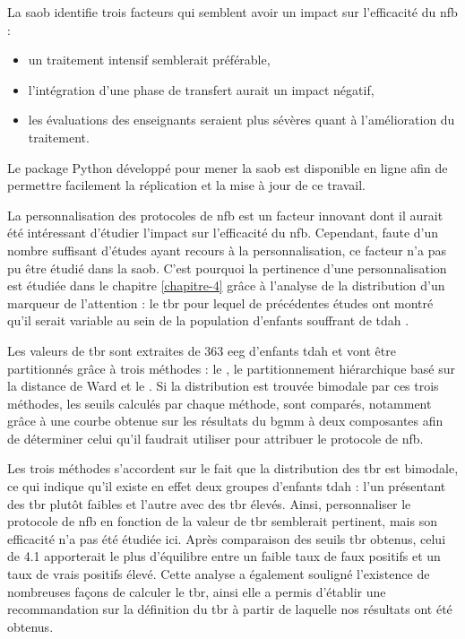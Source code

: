 La \gls{saob} identifie trois facteurs qui semblent avoir un impact sur l'efficacité du \gls{nfb} : 
\begin{itemize}
\item un traitement intensif semblerait préférable, 
\item l'intégration d'une phase de transfert aurait un impact négatif, 
\item les évaluations des enseignants seraient plus
sévères quant à l'amélioration du traitement. 
\end{itemize}

Le package Python développé pour mener la \gls{saob} est disponible en ligne afin de permettre facilement la réplication et la mise à jour 
de ce travail. 

La personnalisation des protocoles de \gls{nfb} est un facteur innovant dont il aurait été intéressant d'étudier l'impact sur l'efficacité du \gls{nfb}.  
Cependant, faute d'un nombre suffisant d'études ayant recours à la personnalisation, ce facteur n'a pas pu être étudié dans la \gls{saob}. C'est pourquoi
la pertinence d'une personnalisation est étudiée dans le chapitre \ref{chapitre-4} grâce à l'analyse de la distribution d'un marqueur de l'attention : 
le \gls{tbr} pour lequel de précédentes études ont montré qu'il serait variable au sein de la population d'enfants souffrant de \gls{tdah} \citep{Zhang2017, Arns2013, Clarke2001}.

Les valeurs de \gls{tbr} sont extraites de 363 \gls{eeg} d'enfants \gls{tdah} et vont être partitionnés grâce à trois méthodes : le , le partitionnement
hiérarchique basé sur la distance de Ward et le . Si la distribution est trouvée bimodale par ces trois méthodes, les seuils calculés par chaque méthode,
sont comparés, notamment grâce à une courbe  obtenue sur
les résultats du \gls{bgmm} à deux composantes afin de déterminer celui qu'il faudrait utiliser pour attribuer le protocole de \gls{nfb}.

Les trois méthodes s'accordent sur le fait que la distribution des \gls{tbr} est bimodale, ce qui indique qu'il existe en effet deux groupes d'enfants
\gls{tdah} : l'un présentant des \gls{tbr} plutôt faibles et l'autre avec des \gls{tbr} élevés. Ainsi, personnaliser le protocole de \gls{nfb} en 
fonction de la valeur de \gls{tbr} semblerait pertinent, mais son efficacité n'a pas été étudiée ici. Après comparaison des seuils \gls{tbr} obtenus, 
celui de 4.1 apporterait le plus d'équilibre entre 
un faible taux de faux positifs et un taux de vrais positifs élevé. Cette analyse a également souligné l'existence de nombreuses
façons de calculer le \gls{tbr}, ainsi elle a permis d'établir une recommandation sur la définition du \gls{tbr} à partir de laquelle nos
résultats ont été obtenus. 


